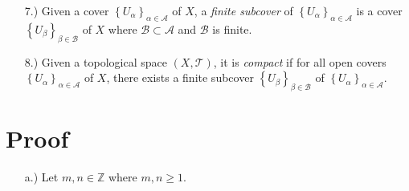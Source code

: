 \documentclass[11pt]{article}
\newcommand{\braces}[1]{\left\{#1\right\}}           %
\newcommand{\Z}{\mathbb{Z}}
\begin{document}
\begin{itemize}
    \item [7.)] Given a cover $\braces{U_\alpha}_{\alpha\in\mathcal{A}}$ of $X$, a \textit{finite subcover} of $\braces{U_\alpha}_{\alpha\in\mathcal{A}}$ is a cover $\braces{U_\beta}_{\beta\in\mathcal{B}}$ of $X$ where $\mathcal{B}\subset\mathcal{A}$ and $\mathcal{B}$ is finite.

    \item [8.)] Given a topological space $(X,\mathcal{T})$, it is \textit{compact} if for all open covers $\braces{U_\alpha}_{\alpha\in\mathcal{A}}$ of $X$, there exists a finite subcover $\braces{U_\beta}_{\beta\in\mathcal{B}}$ of $\braces{U_\alpha}_{\alpha\in\mathcal{A}}$.
\end{itemize}


\section*{Proof}
\begin{itemize}
    \item [a.)] Let
    $m,n\in\Z$
    where
    $m,n\geq1$.
\end{itemize}
\end{document}
